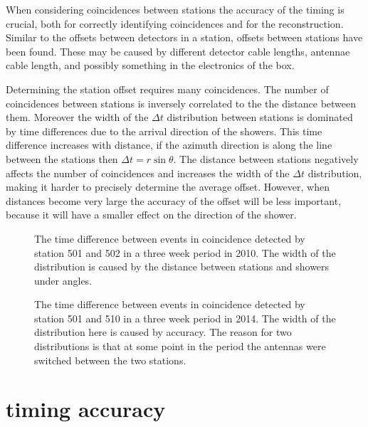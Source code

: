 When considering coincidences between stations the accuracy of the timing is crucial, both for correctly identifying coincidences and for the reconstruction. Similar to the offsets between detectors in a station, offsets between stations have been found. These may be caused by different detector cable lengths, \gps antennae cable length, and possibly something in the electronics of the \hisparc box.

Determining the station offset requires many coincidences. The number of coincidences between stations is inversely correlated to the the distance between them. Moreover the width of the $\Delta t$ distribution between stations is dominated by time differences due to the arrival direction of the showers. This time difference increases with distance, if the azimuth direction is along the line between the stations then $\Delta t = r \sin{\theta}$. The distance between stations negatively affects the number of coincidences and increases the width of the $\Delta t$ distribution, making it harder to precisely determine the average offset. However, when distances become very large the accuracy of the offset will be less important, because it will have a smaller effect on the direction of the shower.

\begin{figure}
    \centering
    
    \caption{ The
             time difference between events in coincidence detected by
             station 501 and 502 in a three week period in 2010. The
             width of the distribution is caused by the distance between
             stations and showers under angles.}
    \label{fig:station_offsets_501_502}
\end{figure}

\begin{figure}
    \centering
    
    \caption{ The
             time difference between events in coincidence detected by
             station 501 and 510 in a three week period in 2014. The
             width of the distribution here is caused by \gps accuracy.
             The reason for two distributions is that at some point in
             the period the \gps antennas were switched between the two
             stations.}
    \label{fig:station_offsets_501_510}
\end{figure}


\section{\gps timing accuracy}
\label{sec:gps_accuracy}

